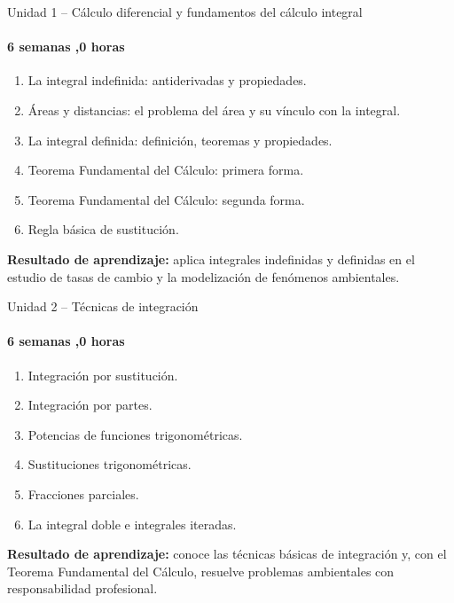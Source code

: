 \documentclass[aspectratio=169,11pt]{beamer}
\begin{document}
\begin{frame}{Unidad 1 -- Cálculo diferencial y fundamentos del cálculo integral}
\framesubtitle{6 semanas \quad\textbullet{},0 horas}
\begin{enumerate}
  \item La integral indefinida: antiderivadas y propiedades.
  \item Áreas y distancias: el problema del área y su vínculo con la integral.
  \item La integral definida: definición, teoremas y propiedades.
  \item Teorema Fundamental del Cálculo: primera forma.
  \item Teorema Fundamental del Cálculo: segunda forma.
  \item Regla básica de sustitución.
\end{enumerate}
\vspace{0.1cm}
\begin{keybox}
\textbf{Resultado de aprendizaje:} aplica integrales indefinidas y definidas en el estudio de tasas de cambio y la modelización de fenómenos ambientales.
\end{keybox}
\end{frame}

\begin{frame}{Unidad 2 -- Técnicas de integración}
\framesubtitle{6 semanas \quad\textbullet{},0 horas}
\begin{enumerate}
  \item Integración por sustitución.
  \item Integración por partes.
  \item Potencias de funciones trigonométricas.
  \item Sustituciones trigonométricas.
  \item Fracciones parciales.
  \item La integral doble e integrales iteradas.
\end{enumerate}
\vspace{0.1cm}
\begin{keybox}
\textbf{Resultado de aprendizaje:} conoce las técnicas básicas de integración y, con el Teorema Fundamental del Cálculo, resuelve problemas ambientales con responsabilidad profesional.
\end{keybox}
\end{frame}
\end{document}
